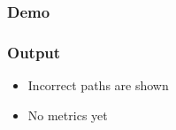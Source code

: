 \documentclass{beamer}
\begin{document}
\begin{frame}
\frametitle{Demo}
\end{frame}

\begin{frame}
\frametitle{Output}
\begin{itemize}
  \item Incorrect paths are shown
  \item No metrics yet
\end{itemize}
\end{frame}
\end{document}
